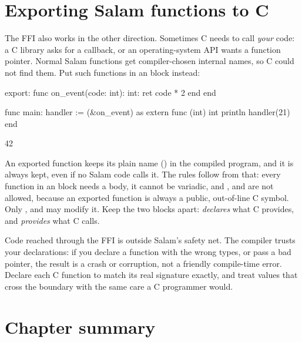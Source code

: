 \section{Exporting Salam functions to C}

The FFI also works in the other direction. Sometimes C needs to call
\emph{your} code: a C library asks for a callback, or an operating-system API
wants a function pointer. Normal Salam functions get compiler-chosen internal
names, so C could not find them. Put such functions in an  block
instead:

\begin{salamen}
export:
    func on_event(code: int): int:
        ret code * 2
    end
end

func main:
    handler := (&on_event) as extern func (int) int
    println handler(21)
end
\end{salamen}

\begin{progout}
42
\end{progout}

An exported function keeps its plain name () in the compiled
program, and it is always kept, even if no Salam code calls it. The rules follow
from that: every function in an  block needs a body, it cannot be
variadic, and ,  and  are not allowed,
because an exported function is always a public, out-of-line C symbol. Only
,  and  may modify it. Keep the two
blocks apart:  \emph{declares} what C provides, and
 \emph{provides} what C calls.

\begin{warn}
Code reached through the FFI is outside Salam's safety net. The compiler trusts
your  declarations: if you declare a function with the wrong types,
or pass a bad pointer, the result is a crash or corruption, not a friendly
compile-time error. Declare each C function to match its real signature exactly,
and treat values that cross the boundary with the same care a C programmer would.
\end{warn}

\section{Chapter summary}

